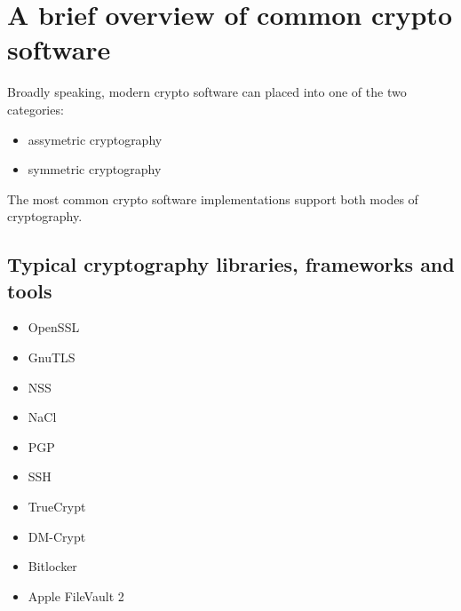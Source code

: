 \section{A brief overview of common crypto software}

Broadly speaking, modern crypto software can placed into one of the two categories:

\begin{itemize}
\item assymetric cryptography 
\item symmetric cryptography
\end{itemize}

The most common crypto software implementations support both modes of cryptography. 

\subsection{Typical cryptography libraries, frameworks and tools}

\begin{itemize}
\item OpenSSL
\item GnuTLS
\item NSS
\item NaCl
\item PGP
\item SSH
\item TrueCrypt
\item DM-Crypt
\item Bitlocker %
\item Apple FileVault 2
\end{itemize}





